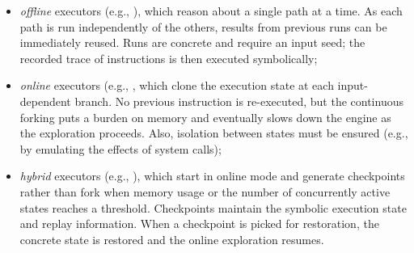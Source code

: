 \begin{itemize}
  \item {\em offline} executors (e.g., \cite{SAGE-NDSS08}), which reason about a single path at a time. As each path is run independently of the others, results from previous runs can be immediately reused. Runs are concrete and require an input seed; the recorded trace of instructions is then executed symbolically;
  \item {\em online} executors (e.g., \cite{KLEE-OSDI08,CKC-TOCS12,AEG-NDSS11}, which clone the execution state at each input-dependent branch. No previous instruction is re-executed, but the continuous forking puts a burden on memory and eventually slows down the engine as the exploration proceeds. Also, isolation between states must be ensured (e.g., by emulating the effects of system calls);
  \item {\em hybrid} executors (e.g., \cite{MAYHEM-SP12}), which start in online mode and generate checkpoints rather than fork when memory usage or the number of concurrently active states reaches a threshold. Checkpoints maintain the symbolic execution state and replay information. When a checkpoint is picked for restoration, the concrete state is restored and the online exploration resumes.
\end{itemize}

